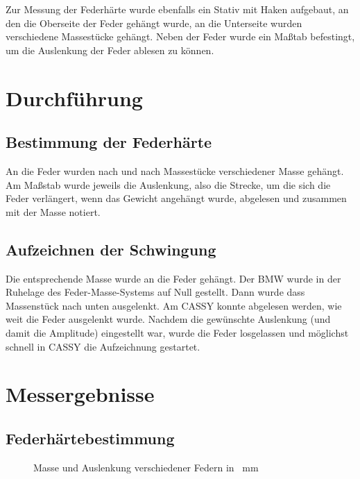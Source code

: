 Zur Messung der Federhärte wurde ebenfalls ein Stativ mit Haken aufgebaut, an den die Oberseite der Feder gehängt wurde, an die Unterseite wurden verschiedene Massestücke gehängt. Neben der Feder wurde ein Maßtab befestingt, um die Auslenkung der Feder ablesen zu können.


\section{Durchführung}
\subsection{Bestimmung der Federhärte}
An die Feder wurden nach und nach Massestücke verschiedener Masse gehängt. Am Maßstab wurde jeweils die Auslenkung, also die Strecke, um die sich die Feder verlängert, wenn das Gewicht angehängt wurde, abgelesen und zusammen mit der Masse notiert.

\subsection{Aufzeichnen der Schwingung}
Die entsprechende Masse wurde an die Feder gehängt. Der BMW wurde in der Ruhelage des Feder-Masse-Systems auf Null gestellt. Dann wurde dass Massenstück nach unten ausgelenkt. Am CASSY konnte abgelesen werden, wie weit die Feder ausgelenkt wurde. Nachdem die gewünschte Auslenkung (und damit die Amplitude) eingestellt war, wurde die Feder losgelassen und möglichst schnell in CASSY die Aufzeichnung gestartet.

\section{Messergebnisse}
\subsection{Federhärtebestimmung}
\label{sub:hardness}
\begin{figure}[H]
\centering
{}
\caption{Masse und Auslenkung verschiedener Federn in \SI{}{\milli\meter}}
\end{figure}


